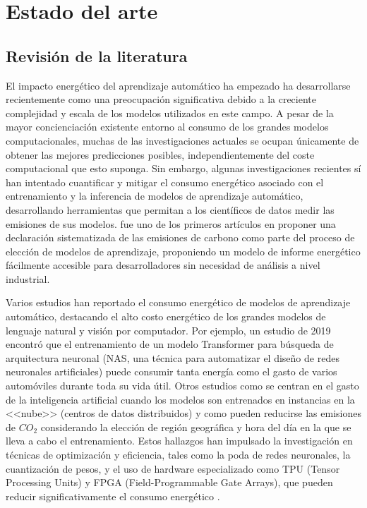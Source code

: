 \chapter{Estado del arte}
\label{chap:sota}

\section{Revisión de la literatura}
\label{sec:lit-rev}


El impacto energético del aprendizaje automático ha empezado ha desarrollarse recientemente como una preocupación significativa debido a la creciente complejidad y escala de los modelos utilizados en este campo. A pesar de la mayor concienciación existente entorno al consumo de los grandes modelos computacionales, muchas de las investigaciones actuales se ocupan únicamente de obtener las mejores predicciones posibles, independientemente del coste computacional que esto suponga. Sin embargo, algunas investigaciones recientes sí han intentado cuantificar y mitigar el consumo energético asociado con el entrenamiento y la inferencia de modelos de aprendizaje automático, desarrollando herramientas que permitan a los científicos de datos medir las emisiones de sus modelos. \cite{lottick2019} fue uno de los primeros artículos en proponer una declaración sistematizada de las emisiones de carbono como parte del proceso de elección de modelos de aprendizaje, proponiendo un modelo de informe energético fácilmente accesible para desarrolladores sin necesidad de análisis a nivel industrial.

Varios estudios han reportado el consumo energético de modelos de aprendizaje automático, destacando el alto costo energético de los grandes modelos de lenguaje natural y visión por computador. Por ejemplo, un estudio de 2019 \cite{strubell2019nlp} encontró que el entrenamiento de un modelo Transformer para búsqueda de arquitectura neuronal (NAS, una técnica para automatizar el diseño de redes neuronales artificiales) puede consumir tanta energía como el gasto de varios automóviles durante toda su vida útil. Otros estudios como \cite{dodge2022cloud} se centran en el gasto de la inteligencia artificial cuando los modelos son entrenados en instancias en la <<nube>> (centros de datos distribuidos) y como pueden reducirse las emisiones de $CO_2$ considerando la elección de región geográfica y hora del día en la que se lleva a cabo el entrenamiento. Estos hallazgos han impulsado la investigación en técnicas de optimización y eficiencia, tales como la poda de redes neuronales, la cuantización de pesos, y el uso de hardware especializado como TPU (Tensor Processing Units) y FPGA (Field-Programmable Gate Arrays), que pueden reducir significativamente el consumo energético \cite{goel2020survey}.


